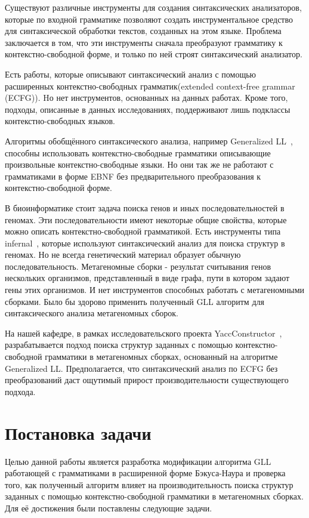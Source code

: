 \documentclass[12pt]{matmex-diploma-custom}
\begin{document}
	Существуют различные инструменты для создания синтаксических анализаторов, которые 
	по входной грамматике позволяют создать инструментальное средство для синтаксической 
	обработки текстов, созданных на этом языке. Проблема заключается в том, что эти инструменты
	сначала преобразуют грамматику к контекстно-свободной форме, и только по ней 
	строят синтаксический анализатор.
	
	Есть работы, которые описывают синтаксический анализ с помощью расширенных
	контекстно-свободных грамматик(extended context-free grammar (ECFG)).
	Hо нет инструментов, основанных на данных работах. Кроме того, подходы, описанные
	в данных исследованиях, поддерживают лишь подклассы контекстно-свободных языков.
	
	Алгоритмы обобщённого синтаксического анализа, например Generalized LL~\cite{scott2010gll}, 
	способны использовать контекстно-свободные грамматики описывающие произвольные 
	контекстно-свободные языки. Но они так же не работают с грамматиками в форме EBNF 
	без предварительного преобразования к контекстно-свободной форме.
	
	В биоинформатике стоит задача поиска генов и иных последовательностей в геномах. 
	Эти последовательности имеют некоторые общие свойства, которые можно описать 
	контекстно-свободной грамматикой. Есть инструменты типа infernal~\cite{Infernal}, которые 
	используют синтаксический анализ для поиска структур в геномах. Но не всегда 
	генетический материал образует обычную последовательность. Метагеномные сборки - 
	результат считывания генов нескольких организмов, представленный в виде графа, пути 
	в котором задают гены этих организмов. И нет инструментов способных работать с 
	метагеномными сборками. Было бы здорово применить полученный GLL алгоритм для
	синтаксического анализа метагеномных сборок.
	
	На нашей кафедре, в рамках исследовательского проекта YaccConstructor~\cite{YaccConstructor},
	разрабатывается подход поиска структур заданных с помощью контекстно-свободной
	грамматики в метагеномных сборках, основанный на алгоритме Generalized LL.
	Предполагается, что синтаксический анализ по ECFG без преобразований даст ощутимый
	прирост производительности существующего подхода.
	
	\section{Постановка задачи}
	
	Целью данной работы является разработка модификации алгоритма GLL работающей с 
	грамматиками в расширенной форме Бэкуса-Наура и проверка того, как полученный 
	алгоритм влияет на производительность поиска структур заданных с помощью 
	контекстно-свободной грамматики в метагеномных сборках. Для её достижения были 
	поставлены следующие задачи.
	
\end{document}
